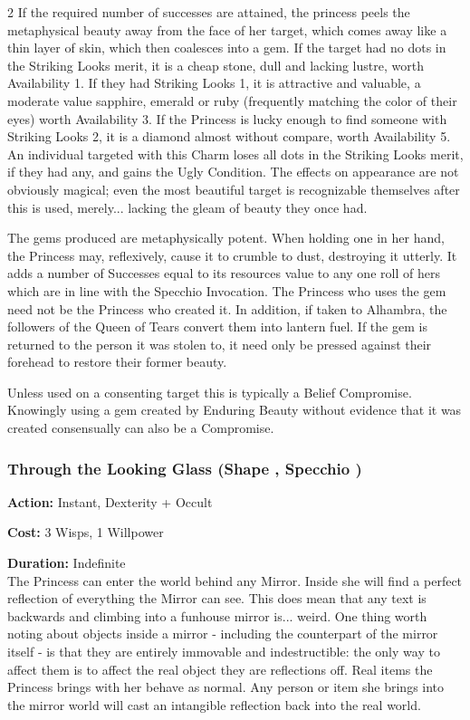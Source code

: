 \begin{multicols}{2}
If the required number of successes are attained, the princess peels the metaphysical beauty away from the face of her target, which comes away like a thin layer of skin, which then coalesces into a gem. If the target had no dots in the Striking Looks merit, it is a cheap stone, dull and lacking lustre, worth Availability 1. If they had Striking Looks 1, it is attractive and valuable, a moderate value sapphire, emerald or ruby (frequently matching the color of their eyes) worth Availability 3. If the Princess is lucky enough to find someone with Striking Looks 2, it is a diamond almost without compare, worth Availability 5. An individual targeted with this Charm loses all dots in the Striking Looks merit, if they had any, and gains the Ugly Condition. The effects on appearance are not obviously magical; even the most beautiful target is recognizable themselves after this is used, merely... lacking the gleam of beauty they once had.

The gems produced are metaphysically potent. When holding one in her hand, the Princess may, reflexively, cause it to crumble to dust, destroying it utterly. It adds a number of Successes equal to its resources value to any one roll of hers which are in line with the Specchio Invocation. The Princess who uses the gem need not be the Princess who created it. In addition, if taken to Alhambra, the followers of the Queen of Tears convert them into lantern fuel. If the gem is returned to the person it was stolen to, it need only be pressed against their forehead to restore their former beauty.

Unless used on a consenting target this is typically a Belief Compromise. Knowingly using a gem created by Enduring Beauty without evidence that it was created consensually can also be a Compromise.
	
\subsubsection*{Through the Looking Glass (Shape \textbullet\textbullet\textbullet\textbullet, Specchio \textbullet\textbullet\textbullet\textbullet\textbullet)}

\noindent \textbf{Action:} Instant, Dexterity + Occult

\noindent \textbf{Cost:} 3 Wisps, 1 Willpower

\noindent \textbf{Duration:} Indefinite \\

\noindent The Princess can enter the world behind any Mirror. Inside she will find a perfect reflection of everything the Mirror can see. This does mean that any text is backwards and climbing into a funhouse mirror is... weird. One thing worth noting about objects inside a mirror - including the counterpart of the mirror itself - is that they are entirely immovable and indestructible: the only way to affect them is to affect the real object they are reflections off. Real items the Princess brings with her behave as normal. Any person or item she brings into the mirror world will cast an intangible reflection back into the real world.


\end{multicols}
